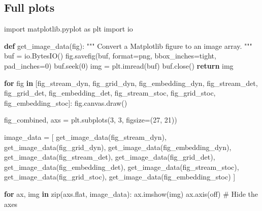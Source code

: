 \documentclass[
  letterpaper,
  DIV=11,
  numbers=noendperiod]{scrreprt}
\newenvironment{Shaded}{\begin{snugshade}}{\end{snugshade}}
\newcommand{\BuiltInTok}[1]{\textcolor[rgb]{0.00,0.23,0.31}{#1}}
\newcommand{\CommentTok}[1]{\textcolor[rgb]{0.37,0.37,0.37}{#1}}
\newcommand{\ControlFlowTok}[1]{\textcolor[rgb]{0.00,0.23,0.31}{\textbf{#1}}}
\newcommand{\DecValTok}[1]{\textcolor[rgb]{0.68,0.00,0.00}{#1}}
\newcommand{\ImportTok}[1]{\textcolor[rgb]{0.00,0.46,0.62}{#1}}
\newcommand{\KeywordTok}[1]{\textcolor[rgb]{0.00,0.23,0.31}{\textbf{#1}}}
\newcommand{\NormalTok}[1]{\textcolor[rgb]{0.00,0.23,0.31}{#1}}
\newcommand{\OperatorTok}[1]{\textcolor[rgb]{0.37,0.37,0.37}{#1}}
\newcommand{\StringTok}[1]{\textcolor[rgb]{0.13,0.47,0.30}{#1}}
\begin{document}
\subsection{Full plots}\label{full-plots}

\begin{Shaded}
\begin{Highlighting}[]
\ImportTok{import}\NormalTok{ matplotlib.pyplot }\ImportTok{as}\NormalTok{ plt}
\ImportTok{import}\NormalTok{ io}

\KeywordTok{def}\NormalTok{ get\_image\_data(fig):}
    \CommentTok{""" Convert a Matplotlib figure to an image array. """}
\NormalTok{    buf }\OperatorTok{=}\NormalTok{ io.BytesIO()}
\NormalTok{    fig.savefig(buf, }\BuiltInTok{format}\OperatorTok{=}\StringTok{\textquotesingle{}png\textquotesingle{}}\NormalTok{, bbox\_inches}\OperatorTok{=}\StringTok{\textquotesingle{}tight\textquotesingle{}}\NormalTok{, pad\_inches}\OperatorTok{=}\DecValTok{0}\NormalTok{)}
\NormalTok{    buf.seek(}\DecValTok{0}\NormalTok{)}
\NormalTok{    img }\OperatorTok{=}\NormalTok{ plt.imread(buf)}
\NormalTok{    buf.close()}
    \ControlFlowTok{return}\NormalTok{ img}

\ControlFlowTok{for}\NormalTok{ fig }\KeywordTok{in}\NormalTok{ [fig\_stream\_dyn, fig\_grid\_dyn, fig\_embedding\_dyn, }
\NormalTok{            fig\_stream\_det, fig\_grid\_det, fig\_embedding\_det, }
\NormalTok{            fig\_stream\_stoc, fig\_grid\_stoc, fig\_embedding\_stoc]:}
\NormalTok{    fig.canvas.draw()}

\NormalTok{fig\_combined, axs }\OperatorTok{=}\NormalTok{ plt.subplots(}\DecValTok{3}\NormalTok{, }\DecValTok{3}\NormalTok{, figsize}\OperatorTok{=}\NormalTok{(}\DecValTok{27}\NormalTok{, }\DecValTok{21}\NormalTok{)) }

\NormalTok{image\_data }\OperatorTok{=}\NormalTok{ [}
\NormalTok{    get\_image\_data(fig\_stream\_dyn),}
\NormalTok{    get\_image\_data(fig\_grid\_dyn),}
\NormalTok{    get\_image\_data(fig\_embedding\_dyn),}
\NormalTok{    get\_image\_data(fig\_stream\_det),}
\NormalTok{    get\_image\_data(fig\_grid\_det),}
\NormalTok{    get\_image\_data(fig\_embedding\_det),}
\NormalTok{    get\_image\_data(fig\_stream\_stoc),}
\NormalTok{    get\_image\_data(fig\_grid\_stoc),}
\NormalTok{    get\_image\_data(fig\_embedding\_stoc)}
\NormalTok{]}

\ControlFlowTok{for}\NormalTok{ ax, img }\KeywordTok{in} \BuiltInTok{zip}\NormalTok{(axs.flat, image\_data):}
\NormalTok{    ax.imshow(img)}
\NormalTok{    ax.axis(}\StringTok{\textquotesingle{}off\textquotesingle{}}\NormalTok{)  }\CommentTok{\# Hide the axes}



\end{Highlighting}
\end{Shaded}
\end{document}
